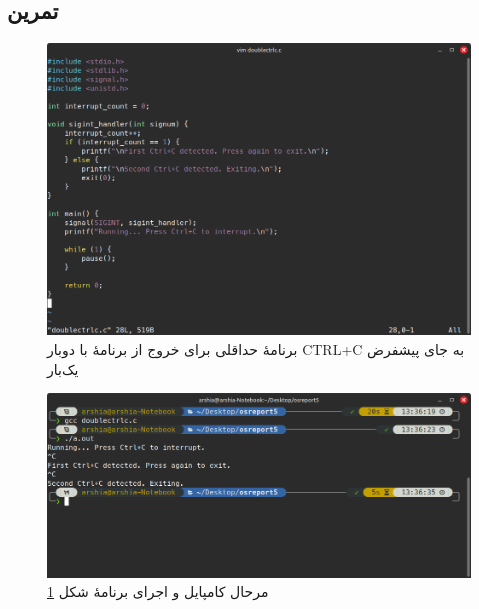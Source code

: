 \documentclass[12pt]{article}
\begin{document}
	\subsection{تمرین}
	\begin{figure}[H]
		\centering
		\includegraphics[width=\textwidth]{report5-resources/13.png}
		\caption{برنامهٔ حداقلی برای خروج از برنامهٔ با دوبار \textenglish{CTRL+C} به جای پیشفرض یک‌بار}
		\label{img:13}
	\end{figure}
	\begin{figure}[H]
		\centering
		\includegraphics[width=\textwidth]{report5-resources/14.png}
		\caption{مرحال کامپایل و اجرای برنامهٔ شکل \ref{img:13}}
		\label{img:14}
	\end{figure}
        
	\newpage
	\begin{LTR}
		\begin{english}
\printbibliography[title={مراجع}]
\end{english}
	\end{LTR}

	
\end{document}

